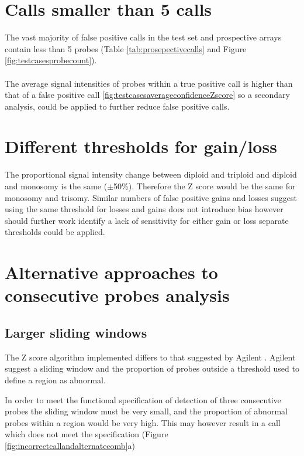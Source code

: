 \section{Calls smaller than 5 calls}
The vast majority of false positive calls in the test set and prospective arrays contain less than 5 probes (Table \ref{tab:prosepectivecalls} and Figure \ref{fig:testcasesprobecount}). 
\paragraph*{}
The average signal intensities of probes within a true positive call is higher than that of a false positive call \ref{fig:testcasesaverageconfidenceZscore} so a secondary analysis, could be applied to further reduce false positive calls. 


\section{Different thresholds for gain/loss}
The proportional signal intensity change between diploid and triploid and diploid and monosomy is the same ($\pm$50\%). Therefore the Z score would be the same for monosomy and trisomy. 
Similar numbers of false positive gains and losses suggest using the same threshold for losses and gains does not introduce bias however should further work identify a lack of sensitivity for either gain or loss separate thresholds could be applied.

\section{Alternative approaches to consecutive probes analysis}
\subsection{Larger sliding windows}
The Z score algorithm implemented differs to that suggested by Agilent \cite{agilent_technologies_agilent_2011}. Agilent suggest a sliding window and the proportion of probes outside a threshold used to define a region as abnormal.

In order to meet the functional specification of detection of three consecutive probes the sliding window must be very small, and the proportion of abnormal probes within a region would be very high. This may however result in a call which does not meet the specification (Figure \ref{fig:incorrectcallandalternatecomb}a)


